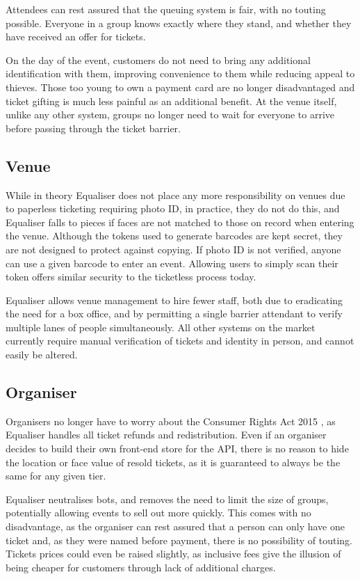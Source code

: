 \documentclass[12pt,a4paper]{bhamdissertation}
\begin{document}
Attendees can rest assured that the queuing system is fair, with no touting possible. Everyone in a group knows exactly where they stand, and whether they have received an offer for tickets.

On the day of the event, customers do not need to bring any additional identification with them, improving convenience to them while reducing appeal to thieves. Those too young to own a payment card are no longer disadvantaged and ticket gifting is much less painful as an additional benefit. At the venue itself, unlike any other system, groups no longer need to wait for everyone to arrive before passing through the ticket barrier.

\subsection{Venue}

While in theory Equaliser does not place any more responsibility on venues due to paperless ticketing requiring photo ID, in practice, they do not do this, and Equaliser falls to pieces if faces are not matched to those on record when entering the venue. Although the tokens used to generate barcodes are kept secret, they are not designed to protect against copying. If photo ID is not verified, anyone can use a given barcode to enter an event. Allowing users to simply scan their token offers similar security to the ticketless process today.

Equaliser allows venue management to hire fewer staff, both due to eradicating the need for a box office, and by permitting a single barrier attendant to verify multiple lanes of people simultaneously. All other systems on the market currently require manual verification of tickets and identity in person, and cannot easily be altered.

\subsection{Organiser}

Organisers no longer have to worry about the Consumer Rights Act 2015 \cite{H15}, as Equaliser handles all ticket refunds and redistribution. Even if an organiser decides to build their own front-end store for the API, there is no reason to hide the location or face value of resold tickets, as it is guaranteed to always be the same for any given tier.

Equaliser neutralises bots, and removes the need to limit the size of groups, potentially allowing events to sell out more quickly. This comes with no disadvantage, as the organiser can rest assured that a person can only have one ticket and, as they were named before payment, there is no possibility of touting. Tickets prices could even be raised slightly, as inclusive fees give the illusion of being cheaper for customers through lack of additional charges.
\end{document}
